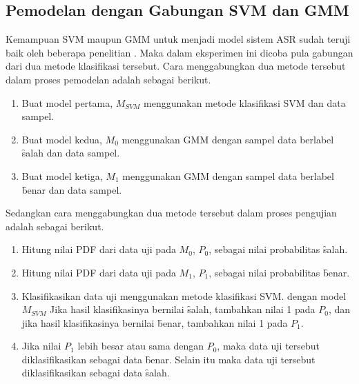   \subsection{Pemodelan dengan Gabungan SVM dan GMM}
	Kemampuan SVM maupun GMM untuk menjadi model sistem ASR sudah teruji baik oleh beberapa penelitian \citep{zahra2013unique}. Maka dalam eksperimen ini dicoba pula gabungan dari dua metode klasifikasi tersebut. Cara menggabungkan dua metode tersebut dalam proses pemodelan adalah sebagai berikut.
	\begin{enumerate}
    \item Buat model pertama, $M_{SVM}$ menggunakan metode klasifikasi SVM dan data sampel.
    \item Buat model kedua, $M_0$ menggunakan GMM dengan sampel data berlabel \f{salah} dan data sampel.
    \item Buat model ketiga, $M_1$ menggunakan GMM dengan sampel data berlabel \f{benar} dan data sampel.
  \end{enumerate}
  Sedangkan cara menggabungkan dua metode tersebut dalam proses pengujian adalah sebagai berikut.
  \begin{enumerate}
    \item Hitung nilai PDF dari data uji pada $M_0$, $P_0$, sebagai nilai probabilitas \f{salah}.
    \item Hitung nilai PDF dari data uji pada $M_1$, $P_1$, sebagai nilai probabilitas \f{benar}.
    \item Klasifikasikan data uji menggunakan metode klasifikasi SVM. dengan model $M_{SVM}$ Jika hasil klasifikasinya bernilai \f{salah}, tambahkan nilai 1 pada $P_0$, dan jika hasil klasifikasinya bernilai \f{benar}, tambahkan nilai 1 pada $P_1$.
    \item Jika nilai $P_1$ lebih besar atau sama dengan $P_0$, maka data uji tersebut diklasifikasikan sebagai data \f{benar}. Selain itu maka data uji tersebut diklasifikasikan sebagai data \f{salah}.
  \end{enumerate}



